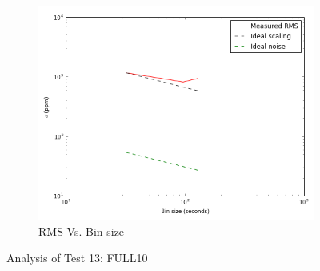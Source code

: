 \documentclass{aastex6}
\begin{document}
\begin{figure}[H]
    \begin{subfigure}{3}
        \includegraphics[scale=0.6]{rms_test13}
        \caption{RMS Vs. Bin size}
    \end{subfigure}
    \caption{Analysis of Test 13: FULL10}
\end{figure}
\end{document}

